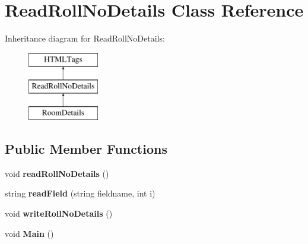 \hypertarget{classReadRollNoDetails}{\section{Read\-Roll\-No\-Details Class Reference}
\label{classReadRollNoDetails}
}
Inheritance diagram for Read\-Roll\-No\-Details\-:\begin{figure}[H]
\begin{center}
\leavevmode
\includegraphics[height=3.000000cm]{classReadRollNoDetails}
\end{center}
\end{figure}
\subsection*{Public Member Functions}
\begin{DoxyCompactItemize}
\item 
\hypertarget{classReadRollNoDetails_a33bc88ab536496022de32f5e30eec0cc}{void {\bfseries read\-Roll\-No\-Details} ()}\label{classReadRollNoDetails_a33bc88ab536496022de32f5e30eec0cc}

\item 
\hypertarget{classReadRollNoDetails_a654f176cecdaed1e661d5ad753ddcb2a}{string {\bfseries read\-Field} (string fieldname, int i)}\label{classReadRollNoDetails_a654f176cecdaed1e661d5ad753ddcb2a}

\item 
\hypertarget{classReadRollNoDetails_a3ebd536e65d2be0909d21420d1cef656}{void {\bfseries write\-Roll\-No\-Details} ()}\label{classReadRollNoDetails_a3ebd536e65d2be0909d21420d1cef656}

\item 
\hypertarget{classReadRollNoDetails_a38a5d6fd6704c950ded2913385a58d0b}{void {\bfseries Main} ()}\label{classReadRollNoDetails_a38a5d6fd6704c950ded2913385a58d0b}

\end{DoxyCompactItemize}
